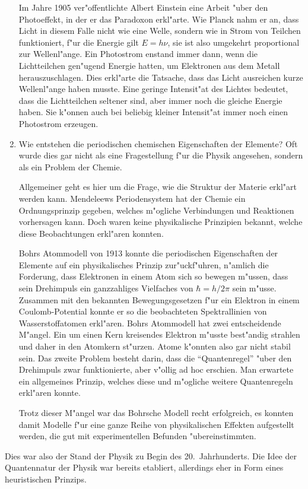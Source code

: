 \begin{enumerate}
Im Jahre 1905 ver"offentlichte Albert Einstein eine Arbeit "uber den
Photoeffekt, in der er das Paradoxon erkl"arte. Wie Planck nahm er an,
dass Licht in diesem Falle nicht wie eine Welle, sondern wie in Strom
von Teilchen funktioniert, f"ur die Energie gilt $E=h\nu$, sie ist also
umgekehrt proportional zur Wellenl"ange.
Ein Photostrom
enstand immer dann, wenn die Lichtteilchen gen"ugend Energie hatten, um
Elektronen aus dem Metall herauszuschlagen. Dies erkl"arte die Tatsache,
dass das Licht ausreichen kurze Wellenl"ange haben musste. Eine geringe
Intensit"at des Lichtes bedeutet, dass die Lichtteilchen seltener sind,
aber immer noch die gleiche Energie haben. Sie k"onnen auch bei beliebig 
kleiner Intensit"at immer noch einen Photostrom erzeugen.

\item
Wie entstehen die periodischen chemischen Eigenschaften der
Elemente? Oft wurde dies gar nicht als eine Fragestellung f"ur die
Physik angesehen, sondern als ein Problem der Chemie.

Allgemeiner geht es hier um die Frage, wie die Struktur der Materie
erkl"art werden kann.
Mendeleews Periodensystem hat der Chemie ein Ordnungsprinzip gegeben,
welches m"ogliche Verbindungen und Reaktionen vorhersagen kann.
Doch waren keine physikalische Prinzipien bekannt, welche diese Beobachtungen
erkl"aren konnten.

Bohrs Atommodell von 1913 konnte die periodischen Eigenschaften der Elemente
auf ein physikalisches Prinzip zur"uckf"uhren, n"amlich die Forderung,
dass Elektronen in einem Atom sich so bewegen m"ussen, dass sein Drehimpuls
ein ganzzahliges Vielfaches von $\hbar = h/2\pi$ sein m"usse.
Zusammen mit den bekannten Bewegungsgesetzen f"ur ein Elektron in einem
Coulomb-Potential konnte er so die beobachteten Spektrallinien von
Wasserstoffatomen erkl"aren. 
Bohrs Atommodell hat zwei entscheidende M"angel.
Ein um einen Kern kreisendes Elektron m"usste best"andig strahlen
und daher in den Atomkern st"urzen. Atome k"onnten also gar nicht
stabil sein.
Das zweite Problem besteht darin, dass die ``Quantenregel'' "uber den 
Drehimpuls zwar funktionierte, aber v"ollig ad hoc erschien.
Man erwartete ein allgemeines Prinzip, welches diese und m"ogliche
weitere Quantenregeln erkl"aren konnte.

Trotz dieser M"angel war das Bohrsche Modell recht erfolgreich, es
konnten damit Modelle f"ur eine ganze Reihe von physikalischen Effekten
aufgestellt werden, die gut mit experimentellen Befunden "ubereinstimmten.
\end{enumerate}
Dies war also der Stand der Physik zu Begin des 20.~Jahrhunderts.
Die Idee der Quantennatur der Physik war bereits etabliert, allerdings
eher in Form eines heuristischen Prinzips.

